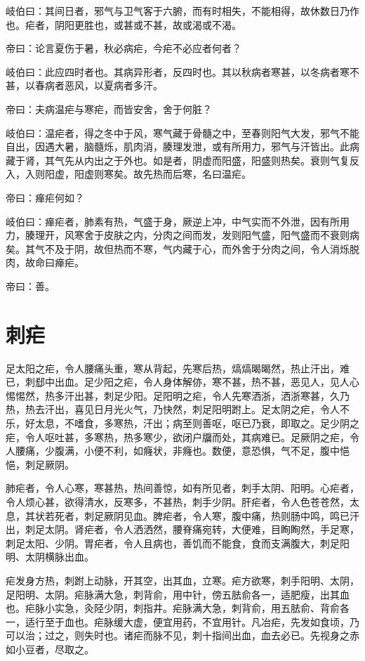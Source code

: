 \documentclass{article}%
\begin{document}
岐伯曰：其间日者，邪气与卫气客于六腑，而有时相失，不能相得，故休数日乃作也。疟者，阴阳更胜也，或甚或不甚，故或渴或不渴。

帝曰：论言夏伤于暑，秋必病疟，今疟不必应者何者？

岐伯曰：此应四时者也。其病异形者，反四时也。其以秋病者寒甚，以冬病者寒不甚，以春病者恶风，以夏病者多汗。

帝曰：夫病温疟与寒疟，而皆安舍，舍于何脏？

岐伯曰：温疟者，得之冬中于风，寒气藏于骨髓之中，至春则阳气大发，邪气不能自出，因遇大暑，脑髓烁，肌肉消，腠理发泄，或有所用力，邪气与汗皆出。此病藏于肾，其气先从内出之于外也。如是者，阴虚而阳盛，阳盛则热矣。衰则气复反入，入则阳虚，阳虚则寒矣。故先热而后寒，名曰温疟。

帝曰：瘅疟何如？

岐伯曰：瘅疟者，肺素有热，气盛于身，厥逆上冲，中气实而不外泄，因有所用力，腠理开，风寒舍于皮肤之内，分肉之间而发，发则阳气盛，阳气盛而不衰则病矣。其气不及于阴，故但热而不寒，气内藏于心，而外舍于分肉之间，令人消烁脱肉，故命曰瘅疟。

帝曰：善。
\section{刺疟}
足太阳之疟，令人腰痛头重，寒从背起，先寒后热，熇熇暍暍然，热止汗出，难已，刺郄中出血。足少阳之疟，令人身体解㑊，寒不甚，热不甚，恶见人，见人心惕惕然，热多汗出甚，刺足少阳。足阳明之疟，令人先寒洒浙，洒浙寒甚，久乃热，热去汗出，喜见日月光火气，乃快然，刺足阳明跗上。足太阴之疟，令人不乐，好太息，不嗜食，多寒热，汗出；病至则善呕，呕已乃衰，即取之。足少阴之疟，令人呕吐甚，多寒热，热多寒少，欲闭户牖而处，其病难已。足厥阴之疟，令人腰痛，少腹满，小便不利，如癃状，非癃也。数便，意恐惧，气不足，腹中悒悒，刺足厥阴。

肺疟者，令人心寒，寒甚热，热间善惊，如有所见者，刺手太阴、阳明。心疟者，令人烦心甚，欲得清水，反寒多，不甚热，刺手少阴。肝疟者，令人色苍苍然，太息，其状若死者，刺足厥阴见血。脾疟者，令人寒，腹中痛，热则肠中鸣，鸣已汗出，刺足太阴。肾疟者，令人洒洒然，腰脊痛宛转，大便难，目眴眴然，手足寒，刺足太阳、少阴。胃疟者，令人且病也，善饥而不能食，食而支满腹大，刺足阳明、太阴横脉出血。

疟发身方热，刺跗上动脉，开其空，出其血，立寒。疟方欲寒，刺手阳明、太阴，足阳明、太阴。疟脉满大急，刺背俞，用中针，傍五胠俞各一，适肥瘦，出其血也。疟脉小实急，灸陉少阴，刺指井。疟脉满大急，刺背俞，用五胠俞、背俞各一，适行至于血也。疟脉缓大虚，便宜用药，不宜用针。凡冶疟，先发如食顷，乃可以治；过之，则失时也。诸疟而脉不见，刺十指间出血，血去必已。先视身之赤如小豆者，尽取之。
\end{document}
